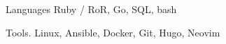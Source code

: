 

\begin{cvskills}

	\cvskill
	{Languages} %
	{Ruby / RoR, Go, SQL, bash} %

	\cvskill
	{Tools\hphantom{25}\color{white}.\hphantom{25}} %
	{Linux, Ansible, Docker, Git, Hugo, Neovim} %

\end{cvskills}
